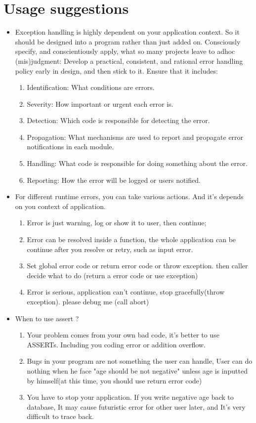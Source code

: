 \documentclass[a4paper,11pt,twoside]{book}
\begin{document}
\section{Usage suggestions}
\begin{itemize}
	\item Exception handling is highly dependent on your application context. So it should be designed into a program rather than just added on. Consciously specify, and conscientiously apply, what so many projects leave to adhoc (mis)judgment: Develop a practical, consistent, and rational error handling policy early in design, and then stick to it. Ensure that it includes:
	
	\begin{enumerate}
		\item Identification: What conditions are errors.
		\item Severity: How important or urgent each error is.
		\item Detection: Which code is responsible for detecting the error.
		\item Propagation: What mechanisms are used to report and propagate error
		notifications in each module.
		\item Handling: What code is responsible for doing something about the error.
		\item Reporting: How the error will be logged or users notified.
	\end{enumerate}
	
	
	\item For different runtime errors, you can take various actions. And it's depends on you context of application.
	
	\begin{enumerate}
		\item Error is just warning, log or show it to user, then continue;
		\item Error can be resolved inside a function, the whole application can be continue after you resolve or retry, such as input error.
		\item Set global error code or return error code or throw exception. then caller decide what to do (return a error code or use exception)
		\item Error is serious, application can't continue, stop gracefully(throw exception).  please debug me (call abort)
	\end{enumerate}
	
	
	\item When to use assert ?
	\begin{enumerate}
		\item Your problem comes from your own bad code, it's better to use ASSERTs.  Including you coding error or addition overflow.
		\item Bugs in your program are not something the user can handle, User can do nothing when he face "age should be not negative" unless age is inputted by himself(at this time, you should use return error code)
		\item You have to stop your application. If you write negative age back to database, It may cause futuristic error for other user later, and It's very difficult to trace back.
	\end{enumerate}
	

\end{itemize}
\end{document}
